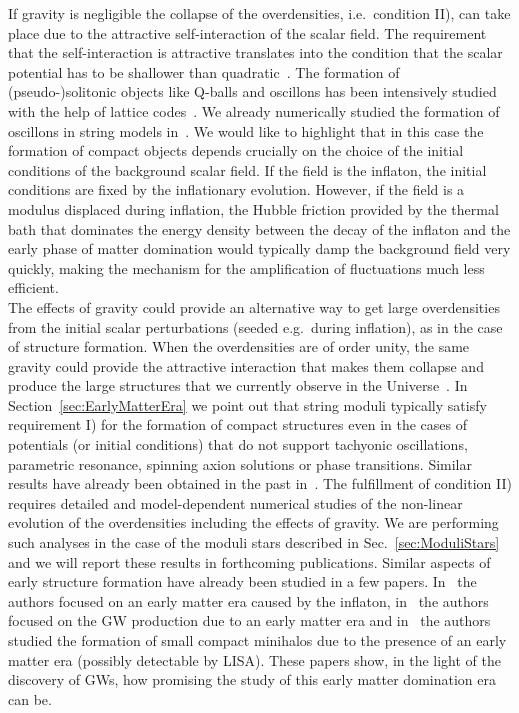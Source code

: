 \documentclass[11pt,a4paper]{article}
\begin{document}
If gravity is negligible the collapse of the overdensities, i.e.~condition II), can take place due to the attractive self-interaction of the scalar field. The requirement that the self-interaction is attractive translates into the condition that the scalar potential has to be shallower than quadratic~\cite{Amin:2013ika}. The formation of (pseudo-)solitonic objects like Q-balls and oscillons has been intensively studied with the help of lattice codes~\cite{Amin:2013ika, Amin:2010jq, Amin:2010dc, Amin:2011hj, Lozanov:2014zfa, Antusch:2015vna, Antusch:2015ziz, Antusch:2016con}. We already numerically studied the formation of oscillons in string models in~\cite{Antusch:2017flz}. We would like to highlight that in this case the formation of compact objects depends crucially on the choice of the initial conditions of the background scalar field. If the field is the inflaton, the initial conditions are fixed by the inflationary evolution. However, if the field is a modulus displaced during inflation, the Hubble friction provided by the thermal bath that dominates the energy density between the decay of the inflaton and the early phase of matter domination would typically damp the background field very quickly, making the mechanism for the amplification of fluctuations much less efficient.\\

The effects of gravity could provide an alternative way to get large overdensities from the initial scalar perturbations (seeded e.g.~during inflation), as in the case of structure formation. When the overdensities are of order unity, the same gravity could provide the attractive interaction that makes them collapse and produce the large structures that we currently observe in the Universe~\cite{Gorbunov:2011zzc}. In Section~\ref{sec:EarlyMatterEra} we point out that string moduli typically satisfy requirement I) for the formation of compact structures even in the cases of potentials (or initial conditions) that do not support tachyonic oscillations, parametric resonance, spinning axion solutions or phase transitions. Similar results have already been obtained in the past in~\cite{Khlopov:1985jw, 0805.1748, Cembranos:2015oya, Hidalgo:2017dfp}. The fulfillment of condition II) requires detailed and model-dependent numerical studies of the non-linear evolution of the overdensities including the effects of gravity. We are performing such analyses in the case of the moduli stars described in Sec.~\ref{sec:ModuliStars} and we will report these results in forthcoming publications. Similar aspects of early structure formation have already been studied in a few papers. In~\cite{Easther:2010mr, Jedamzik:2010dq}  the authors focused on an early matter era caused by the inflaton, in~\cite{Assadullahi:2009nf} the authors focused on the GW production due to an early matter era and in~\cite{Erickcek:2011us} the authors studied the formation of small compact minihalos due to the presence of an early matter era (possibly detectable by LISA). These papers show, in the light of the discovery of GWs, how promising the study of this early matter domination era can be.
\end{document}

